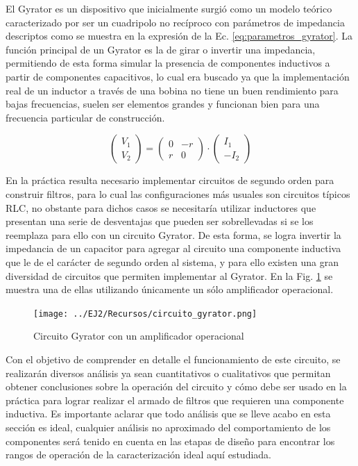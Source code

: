 El Gyrator es un dispositivo que inicialmente surgi\'o como un modelo te\'orico caracterizado por ser un cuadripolo no rec\'iproco con par\'ametros de impedancia
descriptos como se muestra en la expresi\'on de la Ec. \ref{eq:parametros_gyrator}. La funci\'on principal de un Gyrator es la de girar o invertir una impedancia, permitiendo
de esta forma simular la presencia de componentes inductivos a partir de componentes capacitivos, lo cual era buscado ya que la implementaci\'on real de un inductor a trav\'es de una bobina
no tiene un buen rendimiento para bajas frecuencias, suelen ser elementos grandes y funcionan bien para una frecuencia particular de construcci\'on.

\begin{equation*}
    \begin{pmatrix}
        V_1 \\ V_2
    \end{pmatrix}
    =
    \begin{pmatrix}
        0 & -r \\
        r & 0
    \end{pmatrix}
    \cdot 
    \begin{pmatrix}
        I_1 \\ -I_2
    \end{pmatrix}
    \label{eq:parametros_gyrator}
\end{equation*}

En la pr\'actica resulta necesario implementar circuitos de segundo orden para construir filtros, para lo cual las configuraciones m\'as usuales son circuitos
t\'ipicos RLC, no obstante para dichos casos se necesitar\'ia utilizar inductores que presentan una serie de desventajas que pueden ser sobrellevadas si se los reemplaza para ello con un circuito Gyrator.
De esta forma, se logra invertir la impedancia de un capacitor para agregar al circuito una componente inductiva que le de el car\'acter de segundo orden al sistema, y para ello existen una gran diversidad
de circuitos que permiten implementar al Gyrator. En la Fig. \ref{fig:circuito_gyrator} se muestra una de ellas utilizando \'unicamente un s\'olo amplificador operacional.

\begin{figure}[H]
    \centering
    \texttt{[image: ../EJ2/Recursos/circuito\_gyrator.png]}
    \caption{Circuito Gyrator con un amplificador operacional}
    \label{fig:circuito_gyrator}
\end{figure}

Con el objetivo de comprender en detalle el funcionamiento de este circuito, se realizar\'an diversos an\'alisis ya sean cuantitativos o cualitativos que permitan
obtener conclusiones sobre la operaci\'on del circuito y c\'omo debe ser usado en la pr\'actica para lograr realizar el armado de filtros que requieren una componente inductiva. Es importante aclarar que todo an\'alisis que se lleve acabo en esta secci\'on
es ideal, cualquier an\'alisis no aproximado del comportamiento de los componentes ser\'a tenido en cuenta en las etapas de dise\~no para encontrar los rangos de operaci\'on de la caracterizaci\'on ideal aqu\'i estudiada.

